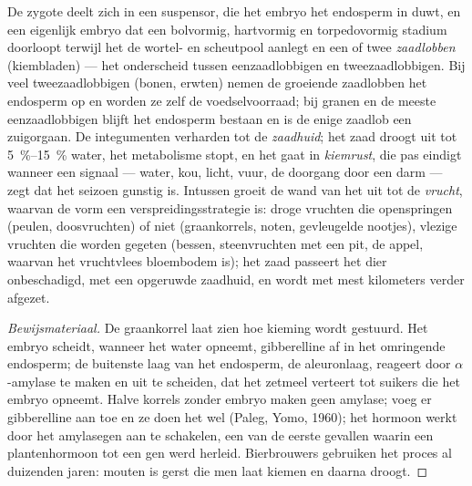 \begin{definition}\label{def:b2:angiosperm-reproduction:seed}
De zygote deelt zich in een suspensor, die het embryo het endosperm in
duwt, en een eigenlijk embryo dat een bolvormig, hartvormig en
torpedovormig stadium doorloopt terwijl het de wortel- en scheutpool
aanlegt en een of twee \emph{zaadlobben} (kiembladen) --- het onderscheid
tussen eenzaadlobbigen en tweezaadlobbigen. Bij veel tweezaadlobbigen
(bonen, erwten) nemen de groeiende zaadlobben het endosperm op en worden
ze zelf de voedselvoorraad; bij granen en de meeste eenzaadlobbigen blijft
het endosperm bestaan en is de enige zaadlob een zuigorgaan. De
integumenten verharden tot de \emph{zaadhuid}; het zaad droogt uit tot
\qtyrange{5}{15}{\%} water, het metabolisme stopt, en het gaat in
\emph{kiemrust}, die pas eindigt wanneer een signaal --- water, kou,
licht, vuur, de doorgang door een darm --- zegt dat het seizoen gunstig
is. Intussen groeit de wand van het  uit tot de
\emph{vrucht}, waarvan de vorm een verspreidingsstrategie is: droge
vruchten die openspringen (peulen, doosvruchten) of niet (graankorrels,
noten, gevleugelde nootjes), vlezige vruchten die worden gegeten (bessen,
steenvruchten met een pit, de appel, waarvan het vruchtvlees bloembodem
is); het zaad passeert het dier onbeschadigd, met een opgeruwde zaadhuid,
en wordt met mest kilometers verder afgezet.
\end{definition}
\begin{proof}[Bewijsmateriaal]
De graankorrel laat zien hoe kieming wordt gestuurd. Het embryo scheidt,
wanneer het water opneemt, gibberelline af in het omringende endosperm;
de buitenste laag van het endosperm, de aleuronlaag, reageert door
$\alpha$-amylase te maken en uit te scheiden, dat het zetmeel verteert tot
suikers die het embryo opneemt. Halve korrels zonder embryo maken geen
amylase; voeg er gibberelline aan toe en ze doen het wel (Paleg, Yomo,
1960); het hormoon werkt door het amylasegen aan te schakelen, een van de
eerste gevallen waarin een plantenhormoon tot een gen werd herleid.
Bierbrouwers gebruiken het proces al duizenden jaren: mouten is gerst die
men laat kiemen en daarna droogt.
\end{proof}

